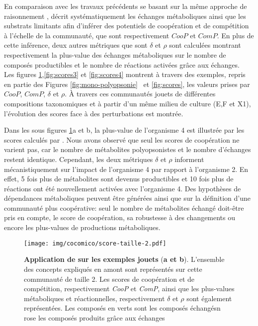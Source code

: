 \documentclass[../main.tex]{subfiles}
\begin{document}
En comparaison avec les travaux précédents se basant sur la même approche de raisonnement \citep{Frioux2018}, \ccmc décrit systématiquement les échanges métaboliques ainsi que les substrats limitants afin d'inférer des potentiels de coopération et de compétition à l'échelle de la communauté, que sont respectivement $CooP$ et $ComP$. En plus de cette inférence, deux autres métriques que sont $\delta$ et $\rho$ sont calculées montrant respectivement la plus-value des échanges métaboliques sur le nombre de composés productibles et le nombre de réactions activées grâce aux échanges. \\

Les figures \ref{fig:scores2},\ref{fig:scores3} et \ref{fig:scores4} montrent à travers des exemples, repris en partie des Figures \ref{fig:mono-polyopsonie} \ et  \ref{fig:scores}, les valeurs prises par $CooP$, $ComP$, $\delta$ et $\rho$. À travers ces communautés jouets de différentes compositions taxonomiques et à partir d'un même milieu de culture (E,F et X1), l'évolution des scores face à des perturbations est montrée.  


Dans les sous figures \ref{fig:scores2}a et b, la plus-value de l'organisme 4 est illustrée par les scores calculés par \ccmc. Nous avons observé que seul les scores de coopération ne varient pas, car le nombre de métabolites polyopsonistes et le nombre d'échanges restent identique. Cependant, les deux métriques $\delta$ et $\rho$ informent mécanistiquement sur l'impact de l'organisme 4 par rapport à l'organisme 2. En effet, 5 fois plus de métabolites sont devenus productibles et 10 fois plus de réactions ont été nouvellement activées avec l'organisme 4. Des hypothèses de dépendances métaboliques peuvent être générées ainsi que sur la définition d'une communauté plus coopérative: seul le nombre de métabolites échangé doit-être pris en compte, le score de coopération, sa robustesse à des changements ou encore les plus-values de productions métaboliques.

\begin{figure}[H]
    \centering
    \texttt{[image: img/cocomico/score-taille-2.pdf]}
    \caption{\textbf{Application de \ccmc sur les exemples jouets} (\textbf{a et b}). L'ensemble des concepts expliqués en amont sont représentés sur cette communauté de taille 2. Les scores de coopération et de compétition, respectivement \textit{CooP} et \textit{ComP}, ainsi que les plus-values métaboliques et réactionnelles, respectivement $\delta$ et $\rho$ sont également représentées. Les composés en verts sont les composés échangésn rose les composés produits grâce aux échanges}
    \label{fig:scores2}
\end{figure}
\end{document}
